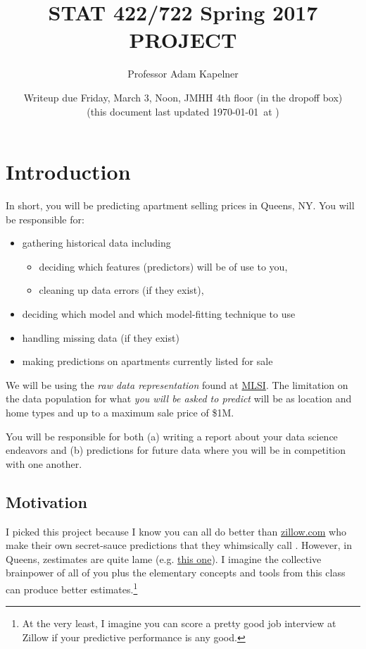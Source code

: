 \documentclass[12pt]{article}
\title{STAT 422/722 Spring 2017 PROJECT}
\author{Professor Adam Kapelner}
\date{Writeup due Friday, March 3, Noon, JMHH 4th floor (in the dropoff box)\\ \vspace{0.5cm} \footnotesize (this document last updated \today ~at \currenttime)}
\begin{document}
\maketitle

\section{Introduction}

In short, you will be predicting apartment selling prices in Queens, NY. You will be responsible for:

\begin{itemize}
\item gathering historical data including
\begin{itemize}
\item deciding which features (predictors) will be of use to you,
\item cleaning up data errors (if they exist),
\end{itemize}
\item deciding which model and which model-fitting technique to use
\item handling missing data (if they exist)
\item making predictions on apartments currently listed for sale
\end{itemize}

We will be using the \emph{raw data representation} found at \href{http://www.mlsli.com/}{MLSI}. The limitation on the data population for what \emph{you will be asked to predict} will be  as location and home types  and  up to a maximum sale price of \$1M.

You will be responsible for both (a) writing a report about your data science endeavors and (b) predictions for future data where you will be in competition with one another.

\subsection{Motivation}

I picked this project because I know you can all do better than \url{zillow.com} who make their own secret-sauce predictions that they whimsically call . However, in Queens, zestimates are quite lame (e.g. \href{http://www.zillow.com/homes/recently_sold/Queens-New-York-NY/condo,apartment_duplex_type/2096496075_zpid/270915_rid/globalrelevanceex_sort/40.890158,-73.462143,40.452172,-74.200287_rect/10_zm/}{this one}). I imagine the collective brainpower of all of you plus the elementary concepts and tools from this class can produce better estimates.\footnote{At the very least, I imagine you can score a pretty good job interview at Zillow if your predictive performance is any good.}
\end{document}
